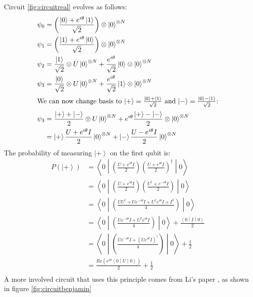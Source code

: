 \documentclass{aux/ttuthes2007}
\newcommand{\ket}[1]{\ensuremath{\left|#1\right\rangle}}
\newcommand{\sandwich}[3]{\left< #1 \middle\vert #2 \middle\vert #3 \right>}
\newcommand{\paren}[1]{\left( #1 \right)}
\newcommand{\elec}{N}
\begin{document}
Circuit \ref{fig:circuitreal} evolves as follows:
\begin{equation*}
	\begin{split}
		\psi_0 
		&= \paren{\frac{\ket 0 + e^{i\theta}\ket 1}{\sqrt 2}}\otimes \ket 0^{\otimes\elec} \\
		\psi_1
		&= \paren{\frac{\ket 1 + e^{i\theta}\ket 0}{\sqrt 2}}\otimes \ket 0^{\otimes\elec} \\
		\psi_2
		&= \frac{\ket 1}{\sqrt 2} \otimes U \ket 0^{\otimes\elec} + \frac{e^{i\theta}}{\sqrt 2}\ket 0 \otimes \ket 0^{\otimes\elec} \\
		\psi_3
		&= \frac{\ket 0}{\sqrt 2} \otimes U \ket 0^{\otimes\elec} + \frac{e^{i\theta}}{\sqrt 2}\ket 1 \otimes \ket 0^{\otimes\elec} \\
		\intertext{\text{We can now change basis to 
		$\ket + = \frac{\ket 0 + \ket 1}{\sqrt 2}$
		and
		$\ket - = \frac{\ket 0 - \ket 1}{\sqrt 2}$:}}
		\psi_3
		&= \frac{\ket + + \ket -}{2} \otimes U \ket 0^{\otimes\elec} + e^{i\theta}\frac{\ket + - \ket -}{2} \otimes \ket 0^{\otimes\elec} \\
		&= \ket + \frac{U + e^{i\theta}I}{2}\ket 0^{\otimes\elec} 
		+ \ket - \frac{U - e^{i\theta}I}{2}\ket 0^{\otimes\elec} 
	\end{split}
\end{equation*}
The probability of measuring $\ket +$ on the first qubit is:
\begin{equation*}
	\begin{split}
		P(\ket +)
		&= \sandwich 0 {
			\paren{\frac{U + e^{i\theta}I}{2}}
			\paren{\frac{U + e^{i\theta}I}{2}}^\dagger
		} 0 \\
		&= \sandwich 0 {
			\paren{\frac{U + e^{i\theta}I}{2}}
			\paren{\frac{U^\dagger + e^{-i\theta}I}{2}}
		} 0 \\
		&= \sandwich 0 {
			\paren{\frac{UU^\dagger + Ue^{-i\theta}I + U^\dagger e^{i\theta}I + I^2}{4}}
		} 0 \\
		&= \sandwich 0 {
			\paren{\frac{Ue^{-i\theta}I + U^\dagger e^{i\theta}I}{4}}
		} 0 
		+ \frac{\sandwich 0 I 0}{2} \\
		&= \sandwich 0 {
			\paren{\frac{Ue^{-i\theta}I + \paren{Ue^{i\theta}I}^\dagger}{4}}
		} 0 
		+ \frac{1}{2} \\
		&= \frac{Re \paren{e^{i\theta}\sandwich 0 { U } 0}}{2}
		+ \frac{1}{2} \\
	\end{split}
\end{equation*}
A more involved circuit that uses this principle comes from Li's paper , as shown in figure \ref{fig:circuitbenjamin}
\end{document}
